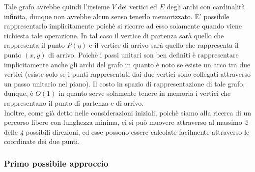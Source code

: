 \documentclass[a4paper,11pt]{article}
\begin{document}
Tale grafo avrebbe quindi l'insieme $V$ dei vertici ed $E$ degli archi con cardinalità infinita, dunque non avrebbe alcun senso tenerlo memorizzato. E' possibile rappresentarlo implicitamente poichè si ricorre ad esso solamente quando viene richiesta tale operazione. In tal caso il vertice di partenza sarà quello che rappresenta il punto $P(\eta)$ e il vertice di arrivo sarà quello che rappresenta il punto $(x, y)$ di arrivo. Poichè i passi unitari son ben definiti è rappresentare implicitamente anche gli archi del grafo in quanto è noto se esiste un arco tra due vertici (esiste solo se i punti rappresentati dai due vertici sono collegati attraverso un passo unitario nel piano). Il costo in spazio di rappresentazione di tale grafo, dunque, è $O(1)$ in quanto serve solamente tenere in memoria i vertici che rappresentano il punto di partenza e di arrivo. \\
Inoltre, come già detto nelle considerazioni iniziali, poichè siamo alla ricerca di un percorso libero con lunghezza minima, ci si può muovere attraverso al massimo \textit{2} delle \textit{4} possibili direzioni, ed esse possono essere calcolate facilmente attraverso le coordinate dei due punti. 

\subsubsection{Primo possibile approccio}
\end{document}
